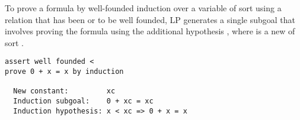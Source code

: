 To prove a formula  by well-founded induction over a variable  of
sort  using a relation  that has been
 or  to be
well founded, LP generates a single subgoal that involves proving the formula
 using the additional hypothesis , where 
is a new  of sort .  

\begin{verbatim}
assert well founded <
prove 0 + x = x by induction

  New constant:         xc
  Induction subgoal:    0 + xc = xc
  Induction hypothesis: x < xc => 0 + x = x
\end{verbatim}
